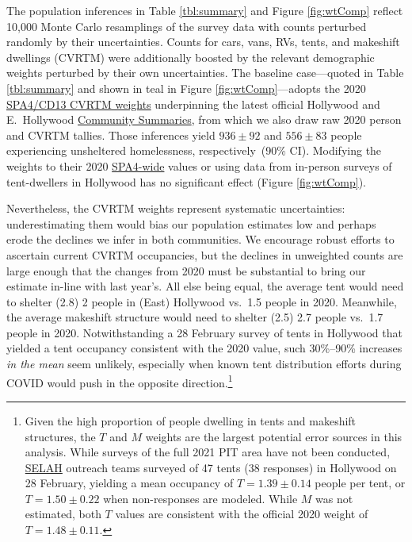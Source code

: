 \documentclass[11pt]{article}
\def\resp{respectively}
\def\selah{SELAH}
\begin{document}
 The population inferences in Table \ref{tbl:summary} and 
Figure \ref{fig:wtComp} reflect 10,000 Monte Carlo resamplings of the survey data with 
counts perturbed randomly by their uncertainties. Counts for cars, vans, RVs, tents, and 
makeshift dwellings (CVRTM) were additionally boosted by the relevant demographic weights 
perturbed by their own uncertainties. The baseline case---quoted in Table \ref{tbl:summary} and 
shown in teal in Figure \ref{fig:wtComp}---adopts the 2020 
\href{https://www.lahsa.org/documents?id=4635-usc-2018-2020-multipliers-and-estimates-overview}
{SPA4/CD13 CVRTM weights} underpinning the latest official Hollywood and E.~Hollywood 
\href{https://www.lahsa.org/documents?id=4686-2020-greater-los-angeles-city-community-homelessness-report-service-planning-area-4.pdf}
{Community Summaries}, from which we also draw raw 2020 person and CVRTM tallies. Those inferences yield 
$936\pm92$ and $556\pm83$ people experiencing unsheltered homelessness, \resp\ (90\% CI). Modifying the weights
to their 2020 \href{https://www.lahsa.org/documents?id=4693-2020-greater-los-angeles-homeless-count-cvrtm-conversion-factors}
{SPA4-wide} values or using data from in-person surveys of tent-dwellers in Hollywood has no
significant effect (Figure \ref{fig:wtComp}).

Nevertheless, the CVRTM weights represent systematic uncertainties: underestimating them would bias
our population estimates low and perhaps erode the declines we infer in both communities. We encourage robust
efforts to ascertain current CVRTM occupancies, but the declines in unweighted counts are large enough that 
the changes from 2020 must be substantial to bring our estimate in-line with last year's. All else being equal, 
the average tent would need to shelter (2.8) 2 people in (East) Hollywood vs.\ 1.5 people in 2020. Meanwhile, 
the average makeshift structure would need to shelter (2.5) 2.7 people vs.\ 1.7 people in 2020. Notwithstanding
a 28 February survey of tents in Hollywood that yielded a tent occupancy consistent with the 2020 value, 
such 30\%--90\% increases {\it in the mean} seem unlikely, especially when known tent distribution efforts 
during COVID would push in the opposite direction.\footnote{Given the high proportion of people dwelling in tents
and makeshift structures, the $T$ and $M$ weights are the largest potential error sources in this analysis. While 
surveys of the full 2021 PIT area have not been conducted, \href{https://selahnch.org}{\selah} outreach teams 
surveyed of 47 tents (38 responses) in Hollywood on 28 February, yielding a mean occupancy of 
$T=1.39\pm0.14$ people per tent, or $T=1.50\pm0.22$ when non-responses are modeled. While $M$ was
not estimated, both $T$ values are consistent with the official 2020 weight of $T=1.48\pm0.11$.}
\end{document}
